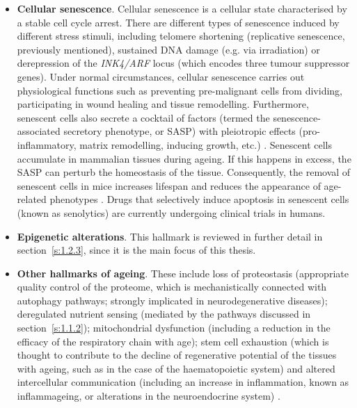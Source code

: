 \begin{itemize}
	\item \textbf{Cellular senescence}. Cellular senescence is a cellular state characterised by a stable cell cycle arrest. There are different types of senescence induced by different stress stimuli, including telomere shortening (replicative senescence, previously mentioned), sustained DNA damage (e.g. via irradiation) or derepression of the \textit{INK4/ARF} locus (which encodes three tumour suppressor genes)\cite{Lopez-Otin2013,Herranz2018}. Under normal circumstances, cellular senescence carries out physiological functions such as preventing pre-malignant cells from dividing, participating in wound healing and tissue remodelling. Furthermore, senescent cells also secrete a cocktail of factors (termed the senescence-associated secretory phenotype, or \acrshort{SASP}) with pleiotropic effects (pro-inflammatory, matrix remodelling, inducing growth, etc.) \cite{Herranz2018}. Senescent cells accumulate in mammalian tissues during ageing. If this happens in excess, the SASP can perturb the homeostasis of the tissue. Consequently, the removal of senescent cells in mice increases lifespan and reduces the appearance of age-related phenotypes \cite{Baker2011,Baker2016,Xu2018}. Drugs that selectively induce apoptosis in senescent cells (known as senolytics) \cite{Kirkland2017} are currently undergoing clinical trials in humans. 
	
	\item \textbf{Epigenetic alterations}. This hallmark is reviewed in further detail in section~\ref{s:1.2.3}, since it is the main focus of this thesis.
	
	\item \textbf{Other hallmarks of ageing}. These include loss of proteostasis (appropriate quality control of the proteome, which is mechanistically connected with autophagy pathways; strongly implicated in neurodegenerative diseases); deregulated nutrient sensing (mediated by the pathways discussed in section~\ref{s:1.1.2}); mitochondrial dysfunction (including a reduction in the efficacy of the respiratory chain with age); stem cell exhaustion (which is thought to contribute to the decline of regenerative potential of the tissues with ageing, such as in the case of the haematopoietic system) and altered intercellular communication (including an increase in inflammation, known as inflammageing, or alterations in the neuroendocrine system) \cite{Lopez-Otin2013}.

	
\end{itemize}

